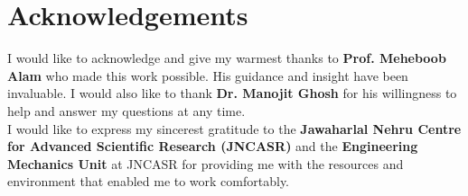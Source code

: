\cleardoublepage
\chapter*{Acknowledgements}

I would like to acknowledge and give my warmest thanks to \textbf{Prof. Meheboob Alam} who made this work possible. His guidance and insight have been invaluable. I would also like to thank \textbf{Dr. Manojit Ghosh} for his willingness to help and answer my questions at any time. \\

\noindent I would like to express my sincerest gratitude to the \textbf{Jawaharlal Nehru Centre for Advanced Scientific Research (JNCASR)} and the \textbf{Engineering Mechanics Unit} at JNCASR for providing me with the resources and environment that enabled me to work comfortably.